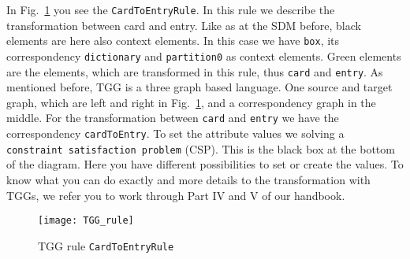 In Fig.~\ref{ea:TGG_rule} you see the \texttt{Card\-To\-Entry\-Rule}. In this rule we describe the transformation between card and entry. Like as at the SDM before, black elements are here also context elements. In this case we have \texttt{box}, its correspondency \texttt{dictionary} and \texttt{partition0} as context elements. Green elements are the elements, which are transformed in this rule, thus \texttt{card} and \texttt{entry}.
\newline
As mentioned before, TGG is a three graph based language. One source and target graph, which are left and right in Fig.~\ref{ea:TGG_rule}, and a correspondency graph in the middle. For the transformation between \texttt{card} and \texttt{entry} we have the correspondency \texttt{cardToEntry}.
\newline
To set the attribute values we solving a \texttt{constraint satisfaction problem} (CSP). This is the black box at the bottom of the diagram. Here you have different possibilities to set or create the values. To know what you can do exactly and more details to the transformation with TGGs, we refer you to work through Part IV and V of our handbook.

\begin{figure}[htbp]
	\centering
  \texttt{[image: TGG\_rule]}
	\caption{TGG rule \texttt{CardToEntryRule}} 
	\label{ea:TGG_rule} 
\end{figure}